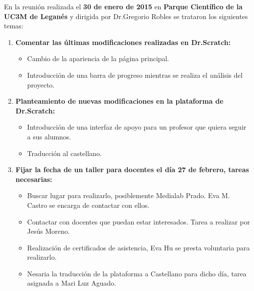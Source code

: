 \documentclass[a4paper,12pt]{letter}
\begin{document}
\begin{letter}
En la reunión realizada el \textbf {30 de enero de 2015} en {\bf Parque 
Científico de la UC3M de Leganés} y dirigida por Dr.Gregorio Robles se trataron 
los siguientes temas:\\

\begin{enumerate}
    
    \item {\textbf {Comentar las últimas modificaciones realizadas en Dr.Scratch:}}
    \begin{itemize}
        \item {Cambio de la apariencia de la página principal.}
        \item {Introducción de una barra de progreso mientras se realiza el análisis del proyecto.}
    \end{itemize}

	\item{\textbf {Planteamiento de nuevas modificaciones en la plataforma de Dr.Scratch:}}
    \begin{itemize}
        \item {Introducción de una interfaz de apoyo para un profesor que quiera 
              seguir a sus alumnos.}
        \item {Traducción al castellano.}
    \end{itemize}

	\item{\textbf {Fijar la fecha de un taller para docentes el día 27 de febrero, 
        tareas necesarias:}}
    \begin{itemize}
        \item {Buscar lugar para realizarlo, posiblemente Medialab Prado. 
              Eva M. Castro se encarga de contactar con ellos.}
        \item {Contactar con docentes que puedan estar interesados. Tarea a 
              realizar por Jesús Moreno.}
        \item {Realización de certificados de asistencia, Eva Hu se presta 
              voluntaria para realizarlo.}
        \item {Nesaria la traducción de la plataforma a Castellano para dicho
               día, tarea asignada a Mari Luz Aguado.}
    \end{itemize}


\end{enumerate}
\end{letter}
\end{document}
